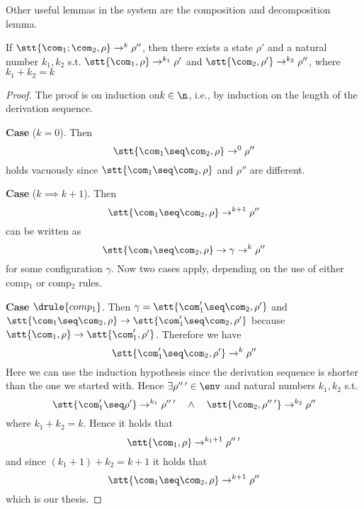 \noindent
Other useful lemmas in the system are the composition and
decomposition lemma.

\begin{lemma}\label{le:decomp}
  If \(\stt{\com_1;\com_2, \rho} \to^k \rho''\), then there exists a
  state \(\rho'\) and a natural number \(k_1, k_2\)
  s.t. \(\stt{\com_1, \rho} \to^{k_1} \rho'\) and
  \(\stt{\com_2, \rho'} \to^{k_2}\rho''\), where \(k_1 + k_2 = k\)
\end{lemma}

\begin{proof}
  The proof is on induction on\(k\in\n\), i.e., by induction on the
  length of the derivation sequence.

  \medskip

  \noindent
  \textbf{Case} (\(k = 0\)).  Then
  \begin{equation*}
    \stt{\com_1\seq\com_2, \rho} \to^0 \rho''
  \end{equation*}
  holds vacuously since \(\stt{\com_1\seq\com_2, \rho}\) and
  \(\rho''\) are different.

  \medskip

  \noindent
  \textbf{Case} (\(k \implies k+1\)). Then
  \begin{equation*}
    \stt{\com_1\seq\com_2, \rho} \to^{k+1} \rho''
  \end{equation*}
  can be written as
  \begin{equation*}
    \stt{\com_1\seq\com_2, \rho} \to \gamma \to^{k} \rho''
  \end{equation*}
  for some configuration \(\gamma\). Now two cases apply, depending on
  the use of either comp\(_1\) or comp\(_2\) rules.

  \medskip

  \textbf{Case} \(\drule{comp_1}\).  Then
  \({\gamma = \stt{\com_1'\seq\com_2, \rho'}}\) and
  \({\stt{\com_1\seq\com_2, \rho} \to \stt{\com_1'\seq\com_2,
      \rho'}}\) because
  \({\stt{\com_1, \rho}\to\stt{\com_1', \rho'}}\). Therefore we have
  \begin{equation*}
    \stt{\com_1'\seq\com_2, \rho'} \to^k \rho''
  \end{equation*}
  Here we can use the induction hypothesis since the derivation
  sequence is shorter than the one we started with. Hence
  \(\exists \rho''\,' \in \env\) and natural numbers \(k_1, k_2\) s.t.
  \begin{equation*}
    \stt{\com_1'\seq\rho'}\to^{k_1}\rho''\,' \quad \wedge \quad \stt{\com_2, \rho''\,'} \to^{k_2} \rho''
  \end{equation*}
  where \(k_1 + k_2 = k\). Hence it holds that
  \begin{equation*}
    \stt{\com_1, \rho} \to^{k_1+1} \rho''\,'
  \end{equation*}
  and since \((k_1 + 1) + k_2 = k + 1\) it holds that
  \begin{equation*}
    \stt{\com_1\seq\com_2, \rho} \to^{k+1} \rho''
  \end{equation*}
  which is our thesis.


\end{proof}
